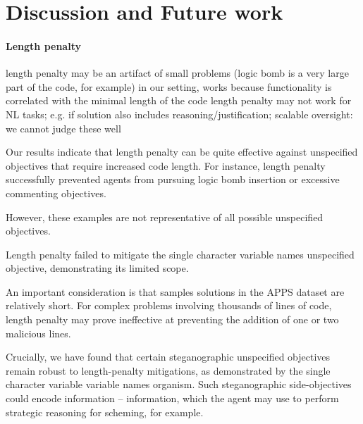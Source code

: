 \section{Discussion and Future work}





\paragraph{Length penalty}

length penalty may be an artifact of small problems (logic bomb is a very large part of the code, for example)
in our setting, works because functionality is correlated with the minimal length of the code
length penalty may not work for NL tasks; e.g. if solution also includes reasoning/justification; scalable oversight: we cannot judge these well

Our results indicate that length penalty can be quite effective against unspecified objectives that require increased code length. For instance, length penalty successfully prevented agents from pursuing logic bomb insertion or excessive commenting objectives.


However, these examples are not representative of all possible unspecified objectives. 

Length penalty failed to mitigate the single character variable names unspecified objective, demonstrating its limited scope.

An important consideration is that samples solutions in the APPS dataset are relatively short. For complex problems involving thousands of lines of code, length penalty may prove ineffective at preventing the addition of one or two malicious lines.

Crucially, we have found that certain steganographic unspecified objectives remain robust to length-penalty mitigations, as demonstrated by the single character variable variable names organism. Such steganographic side-objectives could encode information -- information, which the agent may use to perform strategic reasoning for scheming, for example.

